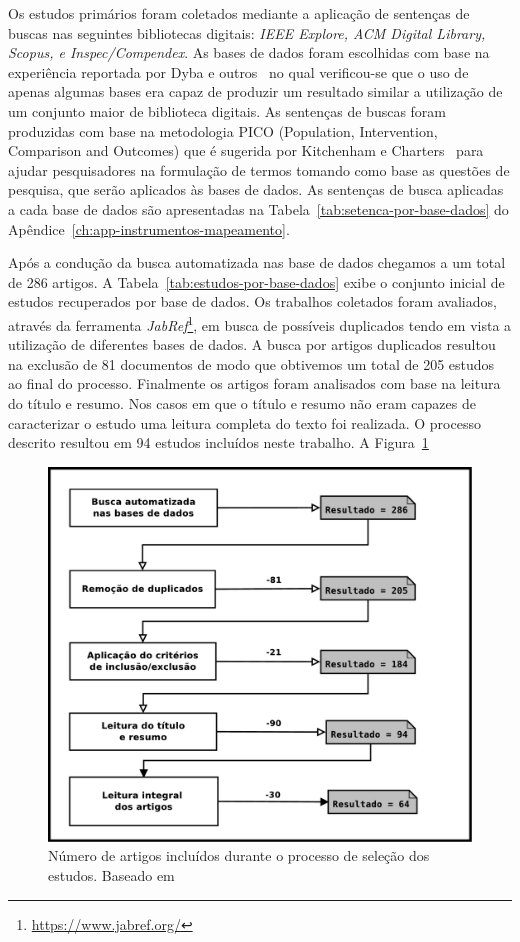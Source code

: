 Os estudos primários foram coletados mediante a aplicação de sentenças de buscas
nas seguintes bibliotecas digitais: \textit{IEEE Explore, ACM Digital Library,
	Scopus, e Inspec/Compendex}. As bases de dados foram escolhidas com base na
experiência reportada por Dyba e outros~\cite{dybaa2007applying}  no qual
verificou-se que o uso de apenas algumas bases era capaz de produzir um
resultado similar a utilização de um conjunto maior de biblioteca digitais. As
sentenças de buscas foram produzidas com base na metodologia PICO (Population,
Intervention, Comparison and Outcomes) que é sugerida por Kitchenham e
Charters~\cite{keele2007guidelines} para ajudar pesquisadores na formulação de
termos tomando como base as questões de pesquisa, que serão aplicados às bases
de dados. As sentenças de busca aplicadas a cada base de dados são apresentadas
na Tabela~\ref{tab:setenca-por-base-dados} do
Apêndice~\ref{ch:app-instrumentos-mapeamento}.

Após a condução da busca automatizada nas base de dados chegamos a um total de
286 artigos. A Tabela~\ref{tab:estudos-por-base-dados} exibe o conjunto inicial
de estudos recuperados por base de dados.  Os trabalhos coletados foram
avaliados, através da ferramenta
\textit{JabRef}\footnote{\url{https://www.jabref.org/}}, em busca de possíveis
duplicados tendo em vista a utilização de diferentes bases de dados. A busca por
artigos duplicados resultou na exclusão de 81 documentos de modo que obtivemos
um total de 205 estudos ao final do processo. Finalmente os artigos foram
analisados com base na leitura do título e resumo. Nos casos em que o título e
resumo não eram capazes de caracterizar o estudo uma leitura completa do texto
foi realizada. O processo descrito resultou em 94 estudos incluídos neste
trabalho. A Figura~\ref{fig:diagrama-processo-selecao}


\begin{figure}
	\centering
	\includegraphics[width=0.75\linewidth]
	{./chapter-mapeamento-sistematico/img/diagrama-processo-selecao.pdf}
	\caption{Número de artigos incluídos durante o processo de seleção dos
		estudos. Baseado
		em~\cite{Petersen2015}}\label{fig:diagrama-processo-selecao}
\end{figure}

